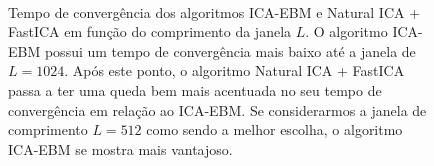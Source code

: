 \begin{figure}
    \centering
    \\
    \caption{Tempo de convergência dos algoritmos ICA-EBM e Natural ICA + FastICA em função do comprimento da janela $L$. O algoritmo ICA-EBM possui um tempo de convergência mais baixo até a janela de $L=1024$. Após este ponto, o algoritmo Natural ICA + FastICA passa a ter uma queda bem mais acentuada no seu tempo de convergência em relação ao ICA-EBM. Se considerarmos a janela de comprimento $L=512$ como sendo a melhor escolha, o algoritmo ICA-EBM se mostra mais vantajoso. }
    \label{fig:naticawindowconvergence}
\end{figure}


